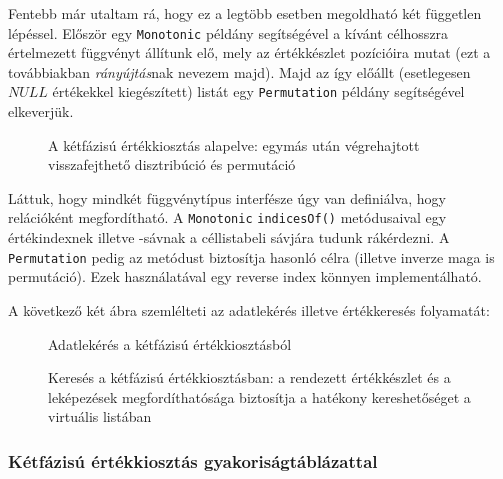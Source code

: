 \documentclass[
    parspace,
    noindent,
    nohyp,
]{elteiktdk}[2023/04/10]
\begin{document}
Fentebb már utaltam rá, hogy ez a legtöbb esetben megoldható két független lépéssel.
Először egy \texttt{Monotonic} példány segítségével a kívánt célhosszra
értelmezett függvényt állítunk elő, mely az értékkészlet pozícióira mutat
(ezt a továbbiakban \textit{rányújtás}nak nevezem majd).
Majd az így előállt (esetlegesen $NULL$ értékekkel kiegészített) listát
egy \texttt{Permutation} példány segítségével elkeverjük.

\begin{figure}[H]
\centering

\caption[A kétfázisú értékkiosztás alapelve]{
    A kétfázisú értékkiosztás alapelve:
    egymás után végrehajtott visszafejthető disztribúció és permutáció
}
\end{figure}

Láttuk, hogy mindkét függvénytípus interfésze úgy van definiálva, hogy relációként megfordítható.
A \texttt{Monotonic} \texttt{indicesOf()} metódusaival egy értékindexnek illetve -sávnak
a céllistabeli sávjára tudunk rákérdezni.
A \texttt{Permutation} pedig az  metódust biztosítja hasonló célra
(illetve inverze maga is permutáció).
Ezek használatával egy reverse index könnyen implementálható.

A következő két ábra szemlélteti az adatlekérés illetve értékkeresés folyamatát:

\begin{figure}[H]
  \centering
  \hspace*{\fill}
  \begin{minipage}[t]{0.42\textwidth}
    
    \caption{Adatlekérés a kétfázisú értékkiosztásból}
  \end{minipage}
  \hspace*{\fill}
  \begin{minipage}[t]{0.42\textwidth}
    
    \caption[Keresés a kétfázisú értékkiosztásban]{
      Keresés a kétfázisú értékkiosztásban:
      a rendezett értékkészlet és a leképezések megfordíthatósága
      biztosítja a hatékony kereshetőséget a virtuális listában
    }
  \end{minipage}
  \hspace*{\fill}
\end{figure}

\subsubsection{Kétfázisú értékkiosztás gyakoriságtáblázattal}
\end{document}
